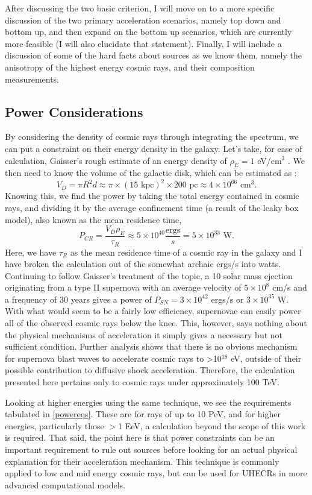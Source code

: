 After discussing the two basic criterion, I will move on to a more specific discussion of the two primary acceleration scenarios, namely top down and bottom up, and then expand on the bottom up scenarios, which are currently more feasible (I will also elucidate that statement). Finally, I will include a discussion of some of the hard facts about sources as we know them, namely the anisotropy of the highest energy cosmic rays, and their composition measurements.

\subsection{Power Considerations}
By considering the density of cosmic rays through integrating the spectrum, we can put a constraint on their energy density in the galaxy. Let's take, for ease of calculation, Gaisser's rough estimate of an energy density of $\rho_E=1$ eV/cm$^3$ \cite{crapp}. We then need to know the volume of the galactic disk, which can be estimated as :
$$V_D=\pi R^2 d\approx \pi \times (15\mbox{ kpc})^2\times200\mbox{ pc}\approx4\times10^{66}\mbox{ cm}^3.$$
Knowing this, we find the power by taking the total energy contained in cosmic rays, and dividing it by the average confinement time (a result of the leaky box model), also known as the mean residence time,
 $$P_{CR}=\frac{V_D \rho_E}{\tau_R}\approx 5\times10^{40} \frac{\mbox{ergs}}{s}=5\times10^{33}\mbox{ W}.$$
 Here, we have $\tau_R$ as the mean residence time of a cosmic ray in the galaxy and I have broken the calculation out of the somewhat archaic ergs/s into watts. Continuing to follow Gaisser's treatment of the topic, a 10 solar mass ejection originating from a type II supernova with an average velocity of $5\times 10^8$ cm/s and a frequency of 30 years gives a power of $P_{SN}=3\times10^{42}$ ergs/s or $3\times 10^{35}$ W. With what would seem to be a fairly low efficiency, supernovae can easily power all of the observed cosmic rays below the knee. This, however, says nothing about the physical mechanisms of acceleration it simply gives a necessary but not sufficient condition. Further analysis shows that there is no obvious mechanism for supernova blast waves to accelerate cosmic rays to \textgreater 10$^{18}$ eV, outside of their possible contribution to diffusive shock acceleration. Therefore, the calculation presented here pertains only to cosmic rays under approximately 100 TeV. 
 
 Looking at higher energies using the same technique, we see the requirements tabulated in \autoref{powereqs}. These are for rays of up to 10 PeV, and for higher energies, particularly those $>$1 EeV, a calculation beyond the scope of this work is required. That said, the point here is that power constraints can be an important requirement to rule out sources before looking for an actual physical explanation for their acceleration mechanism. This technique is commonly applied to low and mid energy cosmic rays, but can be used for UHECRs in more advanced computational models.

